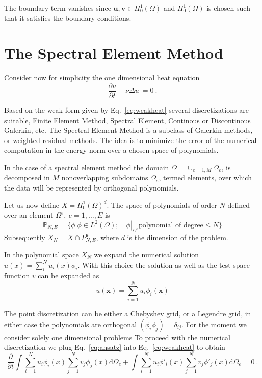 \documentclass[10pt]{article}
\renewcommand{\d}{\mathrm{d}}
\newcommand{\vect}[1]{\mathbf{#1} }
\begin{document}
The boundary term vanishes since $\mathbf u, \mathbf v \in H^1_0(\Omega)$ and $H^1_0(\Omega)$ is chosen such that it satisfies the boundary conditions.
\section{The Spectral Element Method}
Consider now for simplicity the one dimensional heat equation
\begin{equation}
\frac{\partial u}{\partial t} - \nu\Delta u\ =0\ . \label{eq:1dheat}
\end{equation}


Based on the weak form given by Eq.~\ref{eq:weakheat} several discretizations are suitable, Finite Element Method, Spectral Element, Continous or Discontinous Galerkin, etc.
The Spectral Element Method is a subclass of Galerkin methods, or weighted residual methods. 
The idea is to minimize the error of the numerical computation in the energy norm over a 
chosen space of polynomials. 

In the case of a spectral element method the domain $\Omega=\cup_{e=1,M} \Omega_e $, is decomposed in $M$ nonoverlapping 
subdomains $\Omega_e$, termed elements, over which the data will be represented by orthogonal polynomials.

Let us now define $X=H^1_0(\Omega)^d$. The space of polynomials of order $N$ defined over an element $\Omega^e, \ e=1,\ldots, E$ is
$$
\mathbb P_{N,E}=\lbrace  \phi| \phi \in L^2(\Omega); \quad \phi|_{\Omega^e} \text{polynomial of degree} \leq N\rbrace
$$
Subsequently $X_N=X\cap  P_{N,E}^d$, where $d$ is the dimension of the problem.

In the polynomial space $X_N$ we expand the numerical solution $u(x)=\sum_i^N u_i(x)\phi_i$.
With this choice the solution as well as the test space function $v$ can be expanded as
\begin{equation}
u(\vect x)=\sum_{i=1}^N u_{i}\phi_i(\vect x)
\label{eq:ansatz}
\end{equation}

The point discretization can be either a Chebyshev grid, or a Legendre grid, in either case the polynomials are orthogonal $(\phi_i \phi_j)=\delta_{ij}$. 
For the moment we consider solely one dimensional problems
To proceed with the numerical discretization we plug Eq.~\ref{eq:ansatz} into Eq.~\ref{eq:weakheat} to obtain
\begin{equation}
\frac{\partial}{\partial t}\int \sum_{i=1}^N u_{i}\phi_i(x) \sum_{j=1}^N v_{j}\phi_j(x) \d \Omega_e + \int\sum_{i=1}^N u_{i}\phi'_i(x) \sum_{j=1}^N v_{j}\phi'_j(x) \d \Omega_e  =0 \ .
\end{equation}
\end{document}
